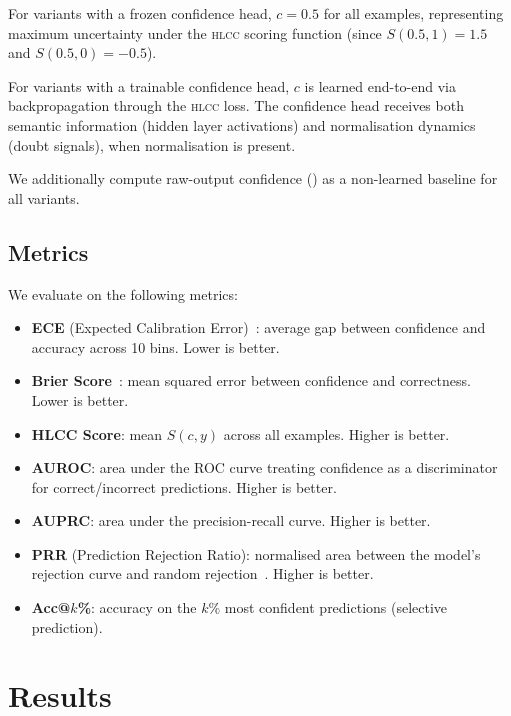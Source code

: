 \documentclass[11pt,a4paper]{article}
\newcommand{\hlcc}{\textsc{hlcc}}
\begin{document}
For variants with a frozen confidence head, $c = 0.5$ for all
examples, representing maximum uncertainty under the \hlcc{} scoring
function (since $S(0.5, 1) = 1.5$ and $S(0.5, 0) = -0.5$).

For variants with a trainable confidence head, $c$ is learned
end-to-end via backpropagation through the \hlcc{} loss.  The
confidence head receives both semantic information (hidden layer
activations) and normalisation dynamics (doubt signals), when
normalisation is present.

We additionally compute raw-output confidence
() as a non-learned baseline for all variants.

\subsection{Metrics}

We evaluate on the following metrics:
\begin{itemize}
  \item \textbf{ECE} (Expected Calibration Error)~\cite{naeini2015obtaining}:
        average gap between confidence and accuracy across 10 bins.
        Lower is better.
  \item \textbf{Brier Score}~\cite{guo2017calibration}:
        mean squared error between confidence and correctness.
        Lower is better.
  \item \textbf{HLCC Score}: mean $S(c, y)$ across all examples.
        Higher is better.
  \item \textbf{AUROC}: area under the ROC curve treating confidence as a
        discriminator for correct/incorrect predictions.  Higher is better.
  \item \textbf{AUPRC}: area under the precision-recall curve.
        Higher is better.
  \item \textbf{PRR} (Prediction Rejection Ratio): normalised area
        between the model's rejection curve and random
        rejection~\cite{fadeeva2024lmpolygraph}.  Higher is better.
  \item \textbf{Acc@$k$\%}: accuracy on the $k$\% most confident
        predictions (selective prediction).
\end{itemize}

\section{Results}
\label{sec:results}
\end{document}
